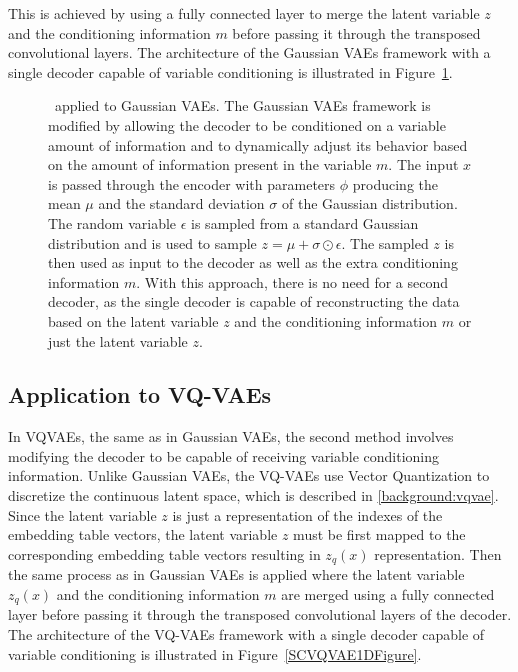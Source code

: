 This is achieved by using a fully connected layer to merge the latent variable
$z$ and the conditioning information $m$ before passing it through the
transposed convolutional layers. The architecture of the Gaussian VAEs
framework with a single decoder capable of variable conditioning is illustrated
in Figure~\ref{SCVAE1DFigure}.

\begin{figure}[H]
    \centering
    
    \caption[ applied to Gaussian VAEs.]%
    {
        \methodTwo\ applied to Gaussian VAEs. The Gaussian VAEs framework is modified by allowing the decoder to be conditioned on a variable amount of information and to dynamically adjust its behavior based on the amount of information present in the variable $m$. The input $x$ is passed through the encoder with parameters $\phi$ producing the mean $\mu$ and the standard deviation $\sigma$ of the Gaussian distribution. The random variable $\epsilon$ is sampled from a standard Gaussian distribution and is used to sample $ z = \mu + \sigma \odot \epsilon$. The sampled $z$ is then used as input to the decoder as well as the extra conditioning information $m$. With this approach, there is no need for a second decoder, as the single decoder is capable of reconstructing the data based on the latent variable $z$ and the conditioning information $m$ or just the latent variable $z$.
    }\label{SCVAE1DFigure}
\end{figure}

\subsection{Application to VQ-VAEs}

In VQVAEs, the same as in Gaussian VAEs, the second method involves modifying the
decoder to be capable of receiving variable conditioning information. Unlike
Gaussian VAEs, the VQ-VAEs use Vector Quantization to discretize the continuous 
latent space, which is described in \autoref{background:vqvae}. Since the latent
variable $z$ is just a representation of the indexes of the embedding table vectors, the latent variable $z$ must be first mapped to the corresponding embedding table vectors resulting in $z_q(x)$ representation. Then the same process as in Gaussian VAEs is applied where the latent variable $z_q(x)$ and the conditioning information $m$ are merged using a fully connected layer before passing it through the transposed convolutional layers of the decoder. The architecture of the VQ-VAEs framework with a single decoder capable of
variable conditioning is illustrated in Figure~\ref{SCVQVAE1DFigure}.


